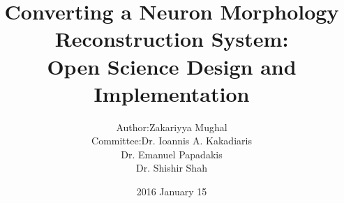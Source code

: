 \title[Converting a Neuron Morphology Reconstruction System: Open Science Design and Implementation]
{Converting a Neuron Morphology Reconstruction System:\\Open Science Design and Implementation}
\author[Zakariyya Mughal]{%
\begin{tabular}{r@{ }l}%
Author:    & Zakariyya Mughal \\[1ex]
Committee: & Dr. Ioannis A. Kakadiaris \\
           & Dr. Emanuel Papadakis \\
           & Dr. Shishir Shah
\end{tabular}%
}
\date{2016 January 15}

